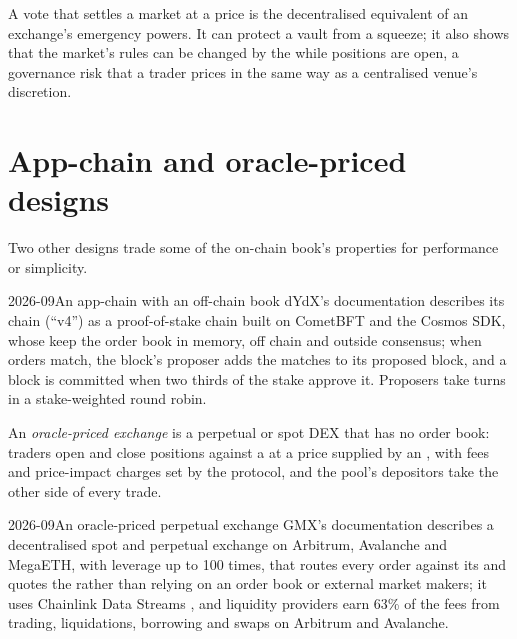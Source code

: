 A vote that settles a market at a price is the decentralised equivalent of an exchange's emergency powers. It can protect a vault from a squeeze; it
also shows that the market's rules can be changed by the  while positions are open, a governance risk that a trader prices in the same way
as a centralised venue's discretion.

\section{App-chain and oracle-priced designs}

Two other designs trade some of the on-chain book's properties for performance or simplicity.

\begin{dated}{2026-09}{An app-chain with an off-chain book}\label{dat:m3:on-chain-order-books-and-perpetual-dexs:dydx}
dYdX's documentation describes its chain (``v4'') as a proof-of-stake chain built on CometBFT and the Cosmos SDK, whose  keep the order book
in memory, off chain and outside consensus; when orders match, the block's proposer adds the matches to its proposed block, and a block is committed when
two thirds of the stake approve it. Proposers take turns in a stake-weighted round robin.
\end{dated}

\begin{definition}\label{def:m3:on-chain-order-books-and-perpetual-dexs:oracle}
An \emph{oracle-priced exchange} is a perpetual or spot DEX that has no order book: traders open and close positions
against a  at a price supplied by an , with fees and price-impact charges set by the protocol, and the pool's depositors take the
other side of every trade.
\end{definition}

\begin{dated}{2026-09}{An oracle-priced perpetual exchange}\label{dat:m3:on-chain-order-books-and-perpetual-dexs:gmx}
GMX's documentation describes a decentralised spot and perpetual exchange on Arbitrum, Avalanche and MegaETH, with leverage up to 100 times, that routes
every order against its  and quotes the   rather than relying on an order book or external market makers; it uses Chainlink
Data Streams , and liquidity providers earn 63\% of the fees from trading, liquidations, borrowing and swaps on Arbitrum and Avalanche.
\end{dated}

